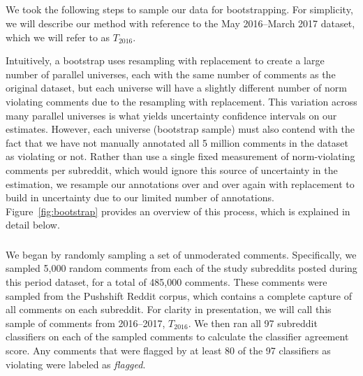 


\subsection{}
We took the following steps to sample our data for bootstrapping. For simplicity, we will describe our method with reference to the May 2016--March 2017 dataset, which we will refer to as $T_{2016}$. 

Intuitively, a bootstrap uses resampling with replacement to create a large number of parallel universes, each with the same number of comments as the original dataset, but each universe will have a slightly different number of norm violating comments due to the resampling with replacement. This variation across many parallel universes is what yields uncertainty confidence intervals on our estimates. However, each universe (bootstrap sample) must also contend with the fact that we have not manually annotated all 5 million comments in the dataset as violating or not. Rather than use a single fixed measurement of norm-violating comments per subreddit, which would ignore this source of uncertainty in the estimation, we resample our annotations over and over again with replacement to build in uncertainty due to our limited number of annotations. Figure~\ref{fig:bootstrap} provides an overview of this process, which is explained in detail below.

\subsubsection{} 
We began by randomly sampling a set of unmoderated comments. Specifically, we sampled 5,000 random comments from each of the study subreddits posted during this period dataset, for a total of 485,000 comments. These comments were sampled from the Pushshift Reddit corpus, which contains a complete capture of all comments on each subreddit. For clarity in presentation, we will call this sample of comments from 2016--2017, $T_{2016}$. We then ran all 97 subreddit classifiers on each of the sampled comments to calculate the classifier agreement score. Any comments that were flagged by at least 80 of the 97 classifiers as violating were labeled as \textit{flagged}.

